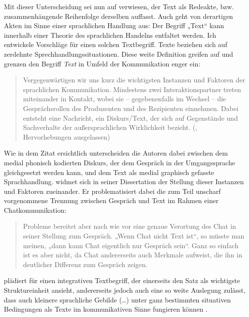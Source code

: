 \begin{sloppypar}
Mit dieser Unterscheidung sei nun auf \citet[184]{coseriu_kontrastive_1988} verwiesen, der Text als Redeakte, bzw. zusammenhängende Reihenfolge derselben auffasst. Auch \citeauthor{ehlich_sprache_2011} geht von derartigen Akten im Sinne einer sprachlichen Handlung aus: \glqq Der Begriff „Text“ kann innerhalb einer Theorie des sprachlichen Handelns entfaltet werden. Ich entwickele Vorschläge für einen solchen Textbegriff. Texte beziehen sich auf zerdehnte Sprechhandlungssituationen.\grqq{} \citep[532]{ehlich_sprache_2011} Diese weite Definition greifen \citet{koch_gesprochene_2011} auf und grenzen den Begriff \emph{Text} in Umfeld der Kommunikation enger ein:
\end{sloppypar}

\begin{quote}
Vergegenwärtigen wir uns kurz die wichtigsten Instanzen und Faktoren der sprachlichen Kommunikation. Mindestens zwei Interaktionspartner treten miteinander in Kontakt, wobei sie -- gegebenenfalls im Wechsel -- die Gesprächsrollen des Produzenten und des Rezipienten einnehmen. Dabei entsteht eine Nachricht, ein Diskurs/Text, der sich auf Gegenstände und Sachverhalte der außersprachlichen Wirklichkeit bezieht. (\cite[6]{koch_gesprochene_2011}, Hervorhebungen ausgelassen)
\end{quote}

Wie in dem Zitat ersichtlich unterscheiden die Autoren dabei zwischen dem medial phonisch kodierten Diskurs, der dem Gespräch in der Umgangssprache gleichgesetzt werden kann, und dem Text als medial graphisch gefasste Sprachhandlung. \citeauthor{beiswenger_sprachhandlungskoordination_2007} widmet sich in seiner Dissertation der Stellung dieser Instanzen und Faktoren zueinander. Er problematisiert dabei die zum Teil unscharf vorgenommene Trennung zwischen Gespräch und Text im Rahmen einer Chatkommunikation:

\begin{quote}
Probleme bereitet aber nach wie vor eine genaue Verortung des Chat in seiner Stellung zum Gespräch. „Wenn Chat nicht Text ist“, so müsste man meinen, „dann kann Chat eigentlich nur Gespräch sein“. Ganz so einfach ist es aber nicht, da Chat andererseits auch Merkmale aufweist, die ihn in deutlicher Differenz zum Gespräch zeigen. \citep[2]{beiswenger_sprachhandlungskoordination_2007}
\end{quote}

\citeauthor{brinker_text-_2001} plädiert für einen integrativen Textbegriff, der einerseits den Satz als \glqq wichtigste Struktureinheit\grqq{} \citep[17]{brinker_text-_2001} ansieht, andererseits jedoch auch eine so weite Auslegung zulässt, dass \glqq auch kleinere sprachliche Gebilde (\dots) unter ganz bestimmten situativen Bedingungen als Texte im kommunikativen Sinne fungieren können\grqq{} \citep[17]{brinker_text-_2001}.

